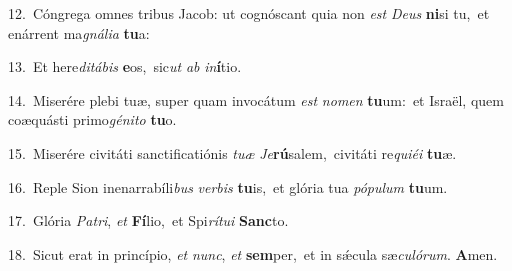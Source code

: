 {\numbfont\textcolor{\numbcolor}{12.}}~Cóngrega omnes tribus Jacob: ut cognóscant quia non \textit{est} \textit{De}\-\textit{us} \textbf{ni}\-si tu,~\star et enárrent ma\-\textit{gná}\-\textit{li}\textit{a} \textbf{tu}\-a:\par
{\numbfont\textcolor{\numbcolor}{13.}}~Et here\-\textit{di}\-\textit{tá}\textit{bis} \textbf{e}\-os,~\star sic\textit{ut} \textit{ab} \textit{in}\-\textbf{í}tio.\par
{\numbfont\textcolor{\numbcolor}{14.}}~Miserére plebi tuæ, super quam invocátum \textit{est} \textit{no}\-\textit{men} \textbf{tu}\-um:~\star et Israël, quem coæquásti primo\-\textit{gé}\-\textit{ni}\textit{to} \textbf{tu}\-o.\par
{\numbfont\textcolor{\numbcolor}{15.}}~Miserére civitáti sanctificatiónis \textit{tu}\-\textit{æ} \textit{Je}\-\textbf{rú}salem,~\star civitáti re\-\textit{qui}\-\textit{é}\textit{i} \textbf{tu}\-æ.\par
{\numbfont\textcolor{\numbcolor}{16.}}~Reple Sion inenarrabíli\textit{bus} \textit{ver}\-\textit{bis} \textbf{tu}\-is,~\star et glória tua \textit{pó}\-\textit{pu}\textit{lum} \textbf{tu}\-um.\par
{\numbfont\textcolor{\numbcolor}{17.}}~Glória \textit{Pa}\-\textit{tri}, \textit{et} \textbf{Fí}\-lio,~\star et Spi\-\textit{rí}\-\textit{tu}\textit{i} \textbf{Sanc}\-to.\par
{\numbfont\textcolor{\numbcolor}{18.}}~Sicut erat in princípio, \textit{et} \textit{nunc}\-, \textit{et} \textbf{sem}\-per,~\star et in sǽcula sæ\-\textit{cu}\-\textit{ló}\textit{rum}. \textbf{A}\-men.\par

